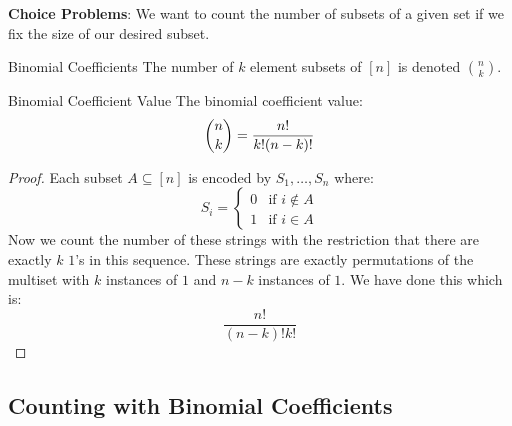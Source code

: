 \documentclass{report}
\begin{document}
\textbf{Choice Problems}: We want to count the number of subsets of a given set if we fix the size of our desired subset.
\begin{definition}{Binomial Coefficients}
    The number of $k$ element subsets of $[n]$ is denoted $\binom{n}{k}$.
\end{definition}

\begin{theorem}{Binomial Coefficient Value}
    The binomial coefficient value:
        \begin{equation*}
            \dbinom{n}{k} = \dfrac{n!}{k!(n - k)!}
        \end{equation*}
\end{theorem}
    \begin{proof}
        Each subset $A \subseteq [n]$ is encoded by $S_{1}, \ldots, S_{n}$ where:
            \begin{equation*}
                S_{i} = \begin{cases}
                    0 & \text{if $i \notin A$} \\
                    1 & \text{if $i \in A$}
                \end{cases}
            \end{equation*}
        Now we count the number of these strings with the restriction that there are exactly $k$ $1$'s in this sequence. These strings are exactly permutations of the multiset with $k$ instances of $1$ and $n - k$ instances of $1$. We have done this which is:
            \begin{equation*}
                \dfrac{n!}{(n - k)!k!}
            \end{equation*}
    \end{proof}

\begin{topic}
    \section{Counting with Binomial Coefficients}
\end{topic}
\end{document}
